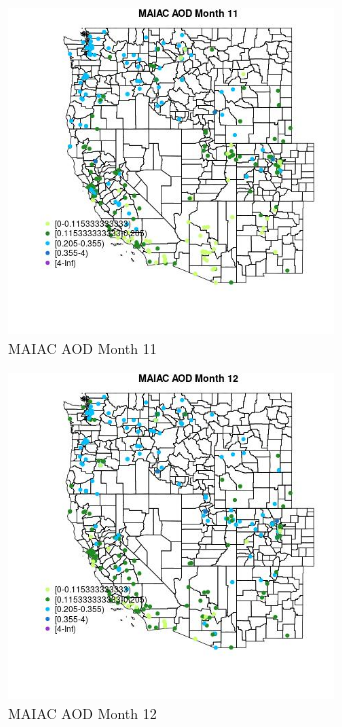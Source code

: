 \begin{figure} 
\centering  
\includegraphics[width=0.77\textwidth]{Code_Outputs/Report_ML_input_PM25_Step4_part_e_de_duplicated_aveswNAs_MapObsMo11MAIAC_AOD.jpg} 
\caption{\label{fig:Report_ML_input_PM25_Step4_part_e_de_duplicated_aveswNAsMapObsMo11MAIAC_AOD}MAIAC AOD Month 11} 
\end{figure} 
 

\begin{figure} 
\centering  
\includegraphics[width=0.77\textwidth]{Code_Outputs/Report_ML_input_PM25_Step4_part_e_de_duplicated_aveswNAs_MapObsMo12MAIAC_AOD.jpg} 
\caption{\label{fig:Report_ML_input_PM25_Step4_part_e_de_duplicated_aveswNAsMapObsMo12MAIAC_AOD}MAIAC AOD Month 12} 
\end{figure} 
 

